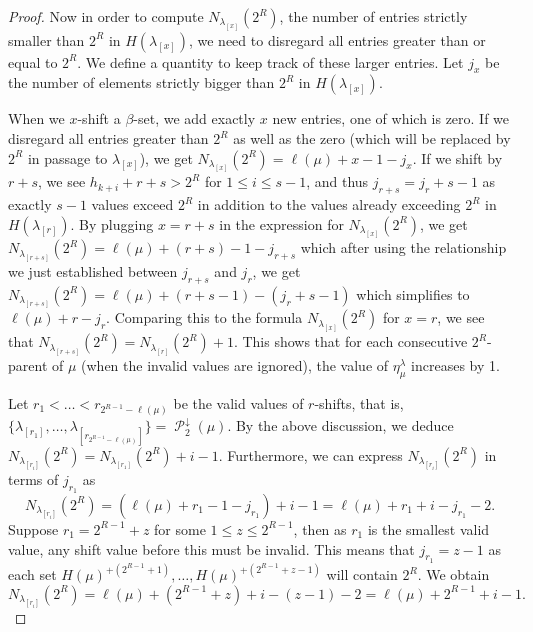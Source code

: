 \documentclass[12pt]{amsart}
\theoremstyle{definition}
\numberwithin{equation}{section}
\newcommand{\la}{\lambda}
\DeclareMathOperator{\p}{\mathcal{P}}
\begin{document}
\begin{proof}
Now in order to compute $N_{\la_{[x]}}(2^R)$, the number of entries strictly smaller than $2^R$ in $H(\la_{[x]})$, we need to disregard all entries greater than or equal to $2^R$. We define a quantity to keep track of these larger entries.
Let $j_x$ be the number of elements strictly bigger than $2^R$ in $H(\lambda_{[x]})$.

When we $x$-shift a $\beta$-set, we add exactly $x$ new entries, one of which is zero. If we disregard all entries greater than $2^R$ as well as the zero (which will be replaced by $2^R$ in passage to $\la_{[x]}$), we get
$N_{\lambda_{[x]}}(2^R) = \ell(\mu) + x - 1 - j_x$. If we shift by $r+s$, we see 
$h_{k+i} + r + s > 2^R$ for $1\leq i \leq s-1$, and thus $j_{r+s} = j_r + s - 1$ as exactly $s-1$ values exceed $2^R$ in addition to the values already exceeding $2^R$ in $H(\la_{[r]})$. By plugging $x = r+s$ in the expression for $N_{\lambda_{[x]}}(2^R)$, we get $N_{\lambda_{[r+s]}}(2^R) = \ell(\mu) + (r+s) - 1 - j_{r+s}$ which after using the relationship we just established between $j_{r+s}$ and $j_{r}$, we get $N_{\lambda_{[r+s]}}(2^R) = \ell(\mu) + (r + s - 1) - (j_r + s - 1)$ which simplifies to $\ell(\mu) + r - j_r$. Comparing this to the formula $ N_{\lambda_{[x]}}(2^R)$ for $x = r$, we see that $N_{\lambda_{[r+s]}}(2^R) =N_{\lambda_{[r]}}(2^R) + 1$. This shows that for each consecutive $2^R$-parent of $\mu$ (when the invalid values are ignored), the value of $\eta_\mu^\lambda$ increases by 1.

Let $r_1 < \ldots < r_{2^{R-1} - \ell(\mu)}$ be the valid values of $r$-shifts, that is, $\{\lambda_{[r_1]}, \ldots, \lambda_{[r_{2^{R-1} - \ell(\mu)}]}\}= \p_2^\downarrow(\mu)$. By the above discussion, we deduce $N_{\lambda_{[r_i]}}(2^R) = N_{\lambda_{[r_1]}}(2^R) + i - 1$. Furthermore, we can express $N_{\lambda_{[r_i]}}(2^R)$ in terms of $j_{r_1}$ as \[N_{\lambda_{[r_i]}}(2^R) = (\ell(\mu) + r_1 - 1 - j_{r_1}) + i - 1 = \ell(\mu) + r_1 +i - j_{r_1} - 2.\] Suppose $r_1 = 2^{R-1} + z$ for some $1\leq z\leq 2^{R-1}$, then as $r_1$ is the smallest valid value, any shift value before this must be invalid. This means that $j_{r_1} = z-1$ as each set $H(\mu)^{+(2^{R-1} + 1)}, \ldots,  H(\mu)^{+(2^{R-1} + z - 1)}$ will contain $2^R$. We obtain \[N_{\lambda_{[r_i]}}(2^R) = \ell(\mu) + (2^{R-1}+ z) + i - (z-1) - 2 = \ell(\mu) + 2^{R-1} + i -1.\]
\vspace{0.2cm}


\end{proof}
\end{document}
